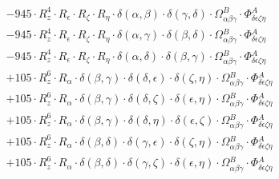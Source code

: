 \documentclass{article}
\begin{document}
\begin{equation}
\begin{array}{c}
 \\[0.2em] 		 - 945 \cdot R_{z}^{4} \cdot R_{\epsilon{}} \cdot R_{\zeta{}} \cdot R_{\eta{}} \cdot \delta{}\left(\alpha{}, \beta{}\right) \cdot \delta{}\left(\gamma{}, \delta{}\right) \cdot \Omega{}^{B}_{\alpha{}\beta{}\gamma{}} \cdot \Phi{}^{A}_{\delta{}\epsilon{}\zeta{}\eta{}} 
 \\[0.2em] 		 - 945 \cdot R_{z}^{4} \cdot R_{\epsilon{}} \cdot R_{\zeta{}} \cdot R_{\eta{}} \cdot \delta{}\left(\alpha{}, \gamma{}\right) \cdot \delta{}\left(\beta{}, \delta{}\right) \cdot \Omega{}^{B}_{\alpha{}\beta{}\gamma{}} \cdot \Phi{}^{A}_{\delta{}\epsilon{}\zeta{}\eta{}} 
 \\[0.2em] 		 - 945 \cdot R_{z}^{4} \cdot R_{\epsilon{}} \cdot R_{\zeta{}} \cdot R_{\eta{}} \cdot \delta{}\left(\alpha{}, \delta{}\right) \cdot \delta{}\left(\beta{}, \gamma{}\right) \cdot \Omega{}^{B}_{\alpha{}\beta{}\gamma{}} \cdot \Phi{}^{A}_{\delta{}\epsilon{}\zeta{}\eta{}} 
 \\[0.2em] 		 + 105 \cdot R_{z}^{6} \cdot R_{\alpha{}} \cdot \delta{}\left(\beta{}, \gamma{}\right) \cdot \delta{}\left(\delta{}, \epsilon{}\right) \cdot \delta{}\left(\zeta{}, \eta{}\right) \cdot \Omega{}^{B}_{\alpha{}\beta{}\gamma{}} \cdot \Phi{}^{A}_{\delta{}\epsilon{}\zeta{}\eta{}} 
 \\[0.2em] 		 + 105 \cdot R_{z}^{6} \cdot R_{\alpha{}} \cdot \delta{}\left(\beta{}, \gamma{}\right) \cdot \delta{}\left(\delta{}, \zeta{}\right) \cdot \delta{}\left(\epsilon{}, \eta{}\right) \cdot \Omega{}^{B}_{\alpha{}\beta{}\gamma{}} \cdot \Phi{}^{A}_{\delta{}\epsilon{}\zeta{}\eta{}} 
 \\[0.2em] 		 + 105 \cdot R_{z}^{6} \cdot R_{\alpha{}} \cdot \delta{}\left(\beta{}, \gamma{}\right) \cdot \delta{}\left(\delta{}, \eta{}\right) \cdot \delta{}\left(\epsilon{}, \zeta{}\right) \cdot \Omega{}^{B}_{\alpha{}\beta{}\gamma{}} \cdot \Phi{}^{A}_{\delta{}\epsilon{}\zeta{}\eta{}} 
 \\[0.2em] 		 + 105 \cdot R_{z}^{6} \cdot R_{\alpha{}} \cdot \delta{}\left(\beta{}, \delta{}\right) \cdot \delta{}\left(\gamma{}, \epsilon{}\right) \cdot \delta{}\left(\zeta{}, \eta{}\right) \cdot \Omega{}^{B}_{\alpha{}\beta{}\gamma{}} \cdot \Phi{}^{A}_{\delta{}\epsilon{}\zeta{}\eta{}} 
 \\[0.2em] 		 + 105 \cdot R_{z}^{6} \cdot R_{\alpha{}} \cdot \delta{}\left(\beta{}, \delta{}\right) \cdot \delta{}\left(\gamma{}, \zeta{}\right) \cdot \delta{}\left(\epsilon{}, \eta{}\right) \cdot \Omega{}^{B}_{\alpha{}\beta{}\gamma{}} \cdot \Phi{}^{A}_{\delta{}\epsilon{}\zeta{}\eta{}} 

\end{array}
\end{equation}
\end{document}
